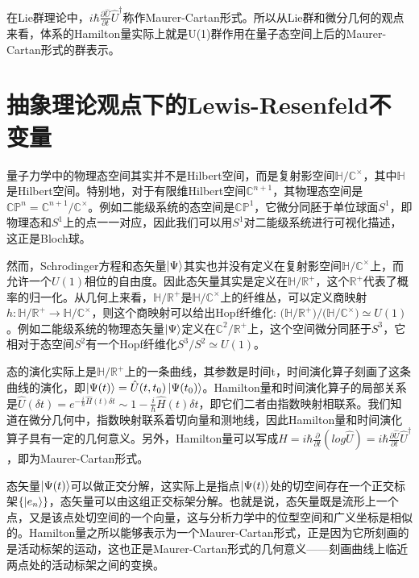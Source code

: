 \documentclass[a4paper]{article}
\begin{document}
        在Lie群理论中，$i\hbar\frac{\partial\hat{U}}{\partial t}\hat{U}^\dagger$称作Maurer-Cartan形式。所以从Lie群和微分几何的观点来看，体系的Hamilton量实际上就是U(1)群作用在量子态空间上后的Maurer-Cartan形式的群表示。



    \section{抽象理论观点下的Lewis-Resenfeld不变量}

        量子力学中的物理态空间其实并不是Hilbert空间，而是复射影空间$\mathbb{H}/\mathbb{C}^\times$，其中$\mathbb{H}$是Hilbert空间。特别地，对于有限维Hilbert空间$\mathbb{C}^{n+1}$，其物理态空间是$\mathbb{CP}^n=\mathbb{C}^{n+1}/\mathbb{C}^\times$。例如二能级系统的态空间是$\mathbb{CP}^1$，它微分同胚于单位球面$S^1$，即物理态和$S^1$上的点一一对应，因此我们可以用$S^1$对二能级系统进行可视化描述，这正是Bloch球。
    
        然而，Schrodinger方程和态矢量$\ket{\Psi}$其实也并没有定义在复射影空间$\mathbb{H}/\mathbb{C}^\times$上，而允许一个$U(1)$相位的自由度。因此态矢量其实是定义在$\mathbb{H}/\mathbb{R}^+$，这个$\mathbb{R}^+$代表了概率的归一化。从几何上来看，$\mathbb{H}/\mathbb{R}^+$是$\mathbb{H}/\mathbb{C}^\times$上的纤维丛，可以定义商映射$h:\mathbb{H}/\mathbb{R}^+\to\mathbb{H}/\mathbb{C}^\times$，则这个商映射可以给出Hopf纤维化: $\bigl(\mathbb{H}/\mathbb{R}^+\bigr) / \bigl(\mathbb{H}/\mathbb{C}^\times\bigr) \simeq U(1)$。例如二能级系统的物理态矢量$\ket{\Psi}$定义在$\mathbb{C}^2/\mathbb{R}^+$上，这个空间微分同胚于$S^3$，它相对于态空间$S^2$有一个Hopf纤维化$S^3/S^2\simeq U(1)$。
        
        态的演化实际上是$\mathbb{H}/\mathbb{R}^+$上的一条曲线，其参数是时间t，时间演化算子刻画了这条曲线的演化，即$\ket{\Psi(t)}=\hat{U}(t,t_0)\ket{\Psi(t_0)}$。Hamilton量和时间演化算子的局部关系是$\hat{U}(\delta t) = e^{-\frac{i}{\hbar}\hat{H}(t)\delta t}\sim 1-\frac{i}{\hbar}\hat{H}(t)\delta t$，即它们二者由指数映射相联系。我们知道在微分几何中，指数映射联系着切向量和测地线，因此Hamilton量和时间演化算子具有一定的几何意义。另外，Hamilton量可以写成$\hat{H}=i\hbar\frac{\partial}{\partial t}(log\hat{U})=i\hbar\frac{\partial\hat{U}}{\partial t}\hat{U}^\dagger$，即为Maurer-Cartan形式。

        态矢量$\ket{\Psi(t)}$可以做正交分解，这实际上是指点$\ket{\Psi(t)}$处的切空间存在一个正交标架$\{\ket{e_n}\}$，态矢量可以由这组正交标架分解。也就是说，态矢量既是流形上一个点，又是该点处切空间的一个向量，这与分析力学中的位型空间和广义坐标是相似的。Hamilton量之所以能够表示为一个Maurer-Cartan形式，正是因为它所刻画的是活动标架的运动，这也正是Maurer-Cartan形式的几何意义——刻画曲线上临近两点处的活动标架之间的变换。
\end{document}
